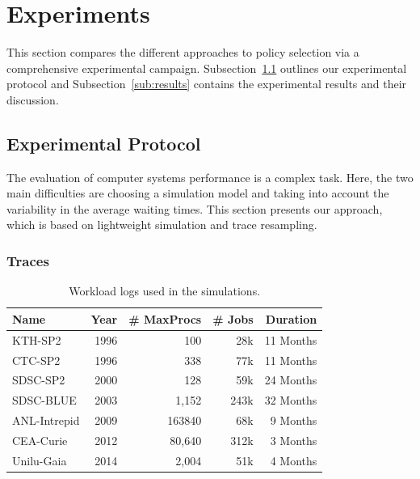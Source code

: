 \documentclass[sigconf,anonymous]{acmart}
\newcommand{\ra}[1]{\renewcommand{\arraystretch}{#1}}
\begin{document}
\section{Experiments}
\label{sec:experiments}

This section compares the different approaches to policy selection via a
comprehensive experimental campaign.  Subsection~\ref{sub:protocol} outlines
our experimental protocol and Subsection~\ref{sub:results} contains the
experimental results and their discussion.

\subsection{Experimental Protocol}
\label{sub:protocol}

The evaluation of computer systems performance is a complex
task. Here, the two main difficulties are choosing a simulation
model and taking into account the variability in the average waiting times.
This section presents our approach, which is based on lightweight simulation
and trace resampling.

\subsubsection{Traces}
\label{sub:traces}

\begin{table}[]
  \centering
  \ra{1.3}
  \caption{Workload logs used in the simulations.}
  \label{tab:logs}
  \begin{tabular}{@{}lrrrr@{}}
    \hline
    Name          & Year & \# MaxProcs & \# Jobs & Duration\\
    \hline
    KTH-SP2       & 1996 & 100         & 28k     & 11 Months\\
    CTC-SP2       & 1996 & 338         & 77k     & 11 Months\\
    SDSC-SP2      & 2000 & 128         & 59k     & 24 Months\\
    SDSC-BLUE     & 2003 & 1,152       & 243k    & 32 Months\\
    ANL-Intrepid  & 2009 & 163840      & 68k     & 9  Months\\
    CEA-Curie     & 2012 & 80,640      & 312k    & 3  Months\\
    Unilu-Gaia    & 2014 & 2,004       & 51k     & 4  Months\\
    \hline
  \end{tabular}
\end{table}
\end{document}
